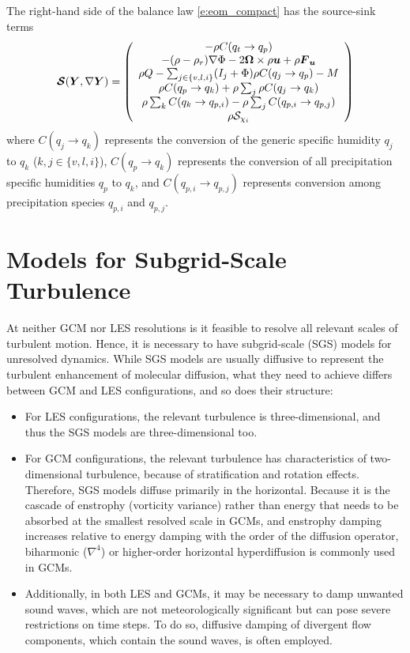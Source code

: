 \documentclass{report}
\begin{document}
The right-hand side of the balance law \eqref{e:eom_compact} has the source-sink terms
\begin{equation}
\Source(\vec{Y}, \grad\vec{Y})= 
 \left( \begin{array}{c}
 -\rho C(q_t \rightarrow q_p) \\
  -(\rho - \rho_r) \grad\Phi - 2 \vec{\Omega} \times \rho\vec{u}  + \rho \vec{F}_{\vec{u}} \\
 \rho Q - \sum_{j\in\{v,l,i\}} (I_j + \Phi)  \rho C(q_j \rightarrow q_p) - M \\%
\rho C(q_p \rightarrow q_k) + \rho \sum_j \rho C(q_j \rightarrow q_k) \\
    \rho \sum_k C(q_k \rightarrow q_{p, i}) - \rho \sum_j C(q_{p, i} \rightarrow q_{p, j})\\
\rho \mathcal{S}_{\chi_i}
\end{array}
\right)
\label{e:source}
\end{equation}
where $C(q_j \rightarrow q_k)$ represents the conversion of the generic specific humidity $q_j$ to $q_k$ ($k, j \in \{v, l, i\}$), $C(q_p \rightarrow q_k)$ represents the conversion of all precipitation specific humidities $q_p$ to $q_k$, and $C(q_{p, i} \rightarrow q_{p, j})$ represents conversion among precipitation species $q_{p, i}$ and $q_{p, j}$. 

\chapter{Models for Subgrid-Scale Turbulence}\label{c:sgs_models}

At neither GCM nor LES resolutions is it feasible to resolve all relevant scales of turbulent motion. Hence, it is necessary to have subgrid-scale (SGS) models for unresolved dynamics. While SGS models are usually diffusive to represent the turbulent enhancement of molecular diffusion,  what they need to achieve differs between GCM and LES configurations, and so does their structure:
\begin{itemize}
    \item For LES configurations, the relevant turbulence is three-dimensional, and thus the SGS models are three-dimensional too. 
    \item For GCM configurations, the relevant turbulence has characteristics of two-dim\-ensio\-nal turbulence, because of stratification and rotation effects. Therefore, SGS models diffuse primarily in the horizontal. Because it is the cascade of enstrophy (vorticity variance) rather than energy that needs to be absorbed at the smallest resolved scale in GCMs, and enstrophy damping increases relative to energy damping with the order of the diffusion operator, biharmonic ($\nabla^4$) or higher-order horizontal hyperdiffusion is commonly used in GCMs. 
    \item Additionally, in both LES and GCMs, it may be necessary to damp unwanted sound waves, which are not meteorologically significant but can pose severe restrictions on time steps. To do so, diffusive damping of divergent flow components, which contain the sound waves, is often employed. 
\end{itemize}
\end{document}

